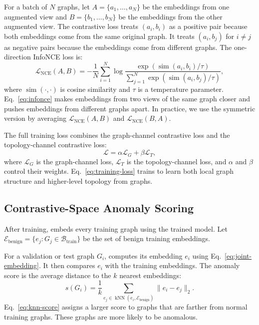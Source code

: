 For a batch of $N$ graphs, let $A=\{a_1,\ldots,a_N\}$ be the embeddings from one augmented view and $B=\{b_1,\ldots,b_N\}$ be the embeddings from the other augmented view. The contrastive loss treats $(a_i,b_i)$ as a positive pair because both embeddings come from the same original graph. It treats $(a_i,b_j)$ for $i\neq j$ as negative pairs because the embeddings come from different graphs. The one-direction InfoNCE loss is:
\begin{equation}
    \mathcal{L}_{\text{NCE}}(A,B)
    =
    -\frac{1}{N}
    \sum_{i=1}^{N}
    \log
    \frac{
        \exp(\operatorname{sim}(a_i,b_i)/\tau)
    }{
        \sum_{j=1}^{N}
        \exp(\operatorname{sim}(a_i,b_j)/\tau)
    },
    \label{eq:infonce}
\end{equation}
where $\operatorname{sim}(\cdot,\cdot)$ is cosine similarity and $\tau$ is a temperature parameter. Eq.~\eqref{eq:infonce} makes embeddings from two views of the same graph closer and pushes embeddings from different graphs apart. In practice, we use the symmetric version by averaging $\mathcal{L}_{\text{NCE}}(A,B)$ and $\mathcal{L}_{\text{NCE}}(B,A)$.

The full training loss combines the graph-channel contrastive loss and the topology-channel contrastive loss:
\begin{equation}
    \mathcal{L}
    =
    \alpha \mathcal{L}_{G}
    +
    \beta \mathcal{L}_{T},
    \label{eq:training-loss}
\end{equation}
where $\mathcal{L}_{G}$ is the graph-channel loss, $\mathcal{L}_{T}$ is the topology-channel loss, and $\alpha$ and $\beta$ control their weights. Eq.~\eqref{eq:training-loss} trains \sysname{} to learn both local graph structure and higher-level topology from graphs.

\subsection{Contrastive-Space Anomaly Scoring}

After training, \sysname{} embeds every training graph using the trained model. Let
$\mathcal{E}_{\text{benign}}=\{e_j : G_j \in \mathcal{B}_{\text{train}}\}$
be the set of benign training embeddings.

For a validation or test graph $G_i$, \sysname{} computes its embedding $e_i$ using Eq.~\eqref{eq:joint-embedding}. It then compares $e_i$ with the training embeddings. The anomaly score is the average distance to the $k$ nearest embeddings:
\begin{equation}
    s(G_i)
    =
    \frac{1}{k}
    \sum_{e_j \in \operatorname{kNN}(e_i,\mathcal{E}_{\text{benign}})}
    \lVert e_i-e_j\rVert_2 .
    \label{eq:knn-score}
\end{equation}
Eq.~\eqref{eq:knn-score} assigns a larger score to graphs that are farther from normal training graphs. These graphs are more likely to be anomalous.

